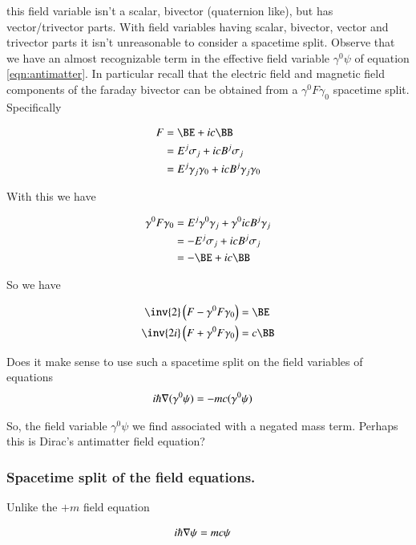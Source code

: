 \documentclass{article}
\begin{document}
this field variable isn't a scalar, bivector (quaternion like), but has vector/trivector parts.  With field variables having scalar, bivector, vector and trivector parts it isn't unreasonable to consider a spacetime split.  Observe that we have an almost recognizable term in the effective field variable $\gamma^0 \psi$ of
equation \ref{eqn:antimatter}.  In particular recall that the electric field and magnetic field components of the faraday bivector can be obtained from a 
$\gamma^0 F \gamma_0$ spacetime split.  Specifically

\begin{align*}
F 
&= \BE + i c \BB \\
&= E^j \sigma_j + i c B^j \sigma_j \\
&= E^j \gamma_j \gamma_0 + i c B^j \gamma_j \gamma_0 \\
\end{align*}

With this we have

\begin{align*}
\gamma^0 F \gamma_0
&= E^j \gamma^0 \gamma_j + \gamma^0 i c B^j \gamma_j \\
&= -E^j \sigma_j + i c B^j \sigma_j \\
&= -\BE + i c \BB
\end{align*}

So we have

\begin{align*}
\inv{2} \left(F - \gamma^0 F \gamma_0 \right) &= \BE \\
\inv{2i} \left(F + \gamma^0 F \gamma_0 \right) &= c \BB
\end{align*}

Does it make sense to use such a spacetime split on the field variables of equations 
\begin{align}\label{eqn:antimatter}
i \hbar \nabla (\gamma^0 \psi) &= -m c (\gamma^0 \psi)
\end{align}

So, the field variable $\gamma^0 \psi$ we find associated with a negated mass term.  Perhaps this is Dirac's antimatter field equation?

\subsubsection{ Spacetime split of the field equations. }

Unlike the $+m$ field equation

\begin{align}\label{eqn:regularMatter}
i \hbar \nabla \psi &= m c \psi
\end{align}
\end{document}
